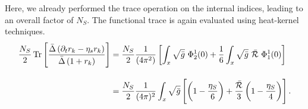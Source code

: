 Here, we already performed the trace operation on the internal indices, leading to an overall factor of $N_S$. The functional trace is again evaluated using heat-kernel techniques. \vfill\newpage
\begin{equation}
\begin{aligned}
	\frac{N_S}{2}\operatorname{Tr}\left[ \frac{\bar{\Delta}\left(\partial_t r_k - \eta_s r_k\right)}{\bar{\Delta}\left(1 + r_k\right)} \right] &= \frac{N_S}{2}\frac{1}{(4\pi^2)}\left[\int_x\sqrt{\bar{g}} \  \Phi_2^1(0) + \frac{1}{6}\int_x\sqrt{\bar{g}} \ \bar{\mathcal{R}}\ \Phi_1^1(0) \right]\\[10pt]
	&= 	\frac{N_S}{2}\frac{1}{(4\pi)^2}\int_x\sqrt{\bar{g}}\left[\left(1-\frac{\eta_S}{6}\right) + \frac{\bar{\mathcal{R}}}{3}\left(1-\frac{\eta_S}{4}\right)\right].
\end{aligned}
\end{equation}
